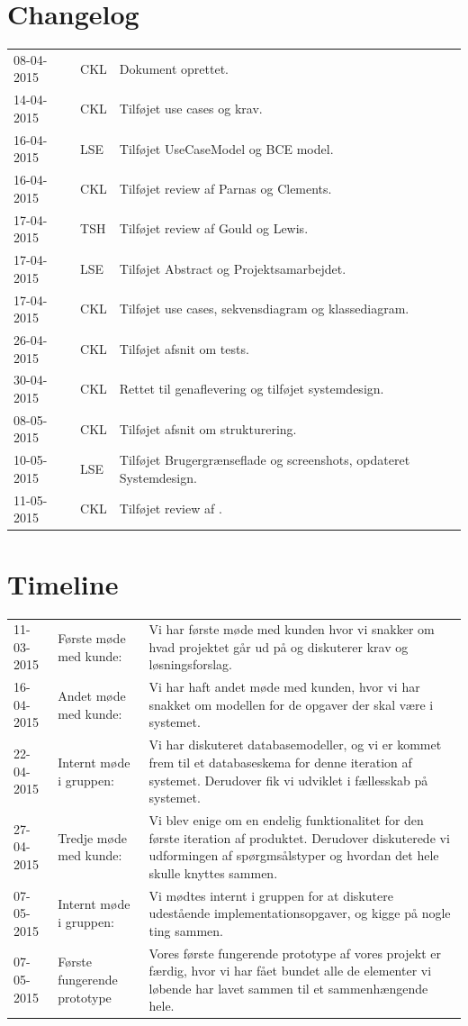 \documentclass[11pt, a4paper]{article}
\begin{document}
\section{Changelog}
\label{sec:changelog}
\begin{tabular}{l l l}
08-04-2015 & CKL & Dokument oprettet. \\
14-04-2015 & CKL & Tilføjet use cases og krav. \\
16-04-2015 & LSE & Tilføjet UseCaseModel og BCE model. \\
16-04-2015 & CKL & Tilføjet review af Parnas og Clements. \\
17-04-2015 & TSH & Tilføjet review af Gould og Lewis. \\
17-04-2015 & LSE & Tilføjet Abstract og Projektsamarbejdet. \\
17-04-2015 & CKL & Tilføjet use cases, sekvensdiagram og klassediagram. \\
26-04-2015 & CKL & Tilføjet afsnit om tests. \\
30-04-2015 & CKL & Rettet til genaflevering og tilføjet systemdesign. \\
08-05-2015 & CKL & Tilføjet afsnit om strukturering. \\
10-05-2015 & LSE & Tilføjet Brugergrænseflade og screenshots, opdateret Systemdesign. \\
11-05-2015 & CKL & Tilføjet review af \cite{nsbullet}. \\
\end{tabular}

\section{Timeline}
\label{sec:timeline}
\begin{tabular}{l l p{8cm}}
11-03-2015 & Første møde med kunde: & Vi har første møde med kunden hvor vi snakker om hvad projektet går ud på og diskuterer krav og løsningsforslag. \\
16-04-2015 & Andet møde med kunde: & Vi har haft andet møde med kunden, hvor vi har snakket om modellen for de opgaver der skal være i systemet. \\
22-04-2015 & Internt møde i gruppen: & Vi har diskuteret databasemodeller, og vi er kommet frem til et databaseskema for denne iteration af systemet. Derudover fik vi udviklet i fællesskab på systemet. \\
27-04-2015 & Tredje møde med kunde: & Vi blev enige om en endelig funktionalitet for den første iteration af produktet. Derudover diskuterede vi udformingen af spørgmsålstyper og hvordan det hele skulle knyttes sammen. \\
07-05-2015 & Internt møde i gruppen: & Vi mødtes internt i gruppen for at diskutere udestående implementationsopgaver, og kigge på nogle ting sammen. \\
07-05-2015 & Første fungerende prototype & Vores første fungerende prototype af vores projekt er færdig, hvor vi har fået bundet alle de elementer vi løbende har lavet sammen til et sammenhængende hele. \\
\end{tabular}
\end{document}
